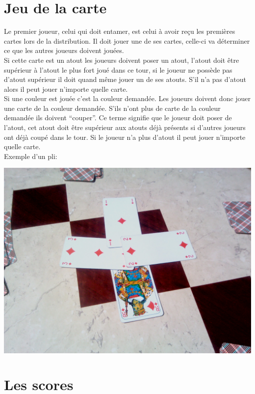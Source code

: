 \documentclass[a4paper]{report}
\begin{document}
	\section{Jeu de la carte}
		Le premier joueur, celui qui doit entamer, est celui à avoir reçu les premières cartes lors de la distribution.
Il doit jouer une de ses cartes, celle-ci va déterminer ce que les autres joueurs doivent jouées.\\
Si cette carte est un atout les joueurs doivent poser un atout, l’atout doit être supérieur à l’atout le plus fort joué dans ce tour, si le joueur ne possède pas d’atout supérieur il doit quand même jouer un de ses atouts. S’il n’a pas d’atout alors il peut jouer n’importe quelle carte.\\
Si une couleur est jouée c’est la couleur demandée. Les joueurs doivent donc jouer une carte de la couleur demandée. S'ils n’ont plus de carte de la couleur demandée ils doivent “couper”. Ce terme signifie que le joueur doit poser de l’atout, cet atout doit être supérieur aux atouts déjà présents si d’autres joueurs ont déjà coupé dans le tour. Si le joueur n’a plus d’atout il peut jouer n’importe quelle carte.\\
		Exemple d'un pli:
			\begin{center}
				\includegraphics[scale=0.15]{Images/2.jpg}
			\end{center}


	\section{Les scores}
		
\end{document}
